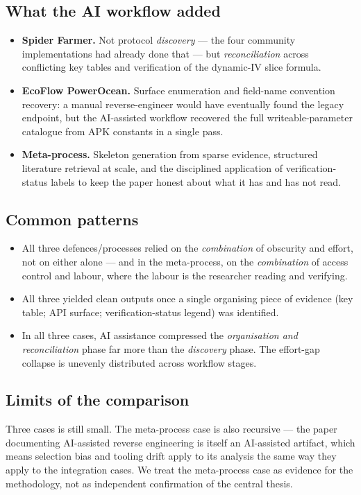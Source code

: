 \documentclass[11pt,a4paper]{article}
\begin{document}
\subsection{What the AI workflow added}
\label{sec:synthesis-ai-lift}
\begin{itemize}
  \item \textbf{Spider Farmer.} Not protocol \emph{discovery} --- the four
        community implementations had already done that --- but
        \emph{reconciliation} across conflicting key tables and verification
        of the dynamic-IV slice formula.
  \item \textbf{EcoFlow PowerOcean.} Surface enumeration and field-name
        convention recovery: a manual reverse-engineer would have eventually
        found the legacy endpoint, but the AI-assisted workflow recovered
        the full writeable-parameter catalogue from APK constants in a
        single pass.
  \item \textbf{Meta-process.} Skeleton generation from sparse evidence,
        structured literature retrieval at scale, and the disciplined
        application of verification-status labels to keep the paper honest
        about what it has and has not read.
\end{itemize}

\subsection{Common patterns}
\label{sec:synthesis-patterns}
\begin{itemize}
  \item All three defences/processes relied on the \emph{combination} of
        obscurity and effort, not on either alone --- and in the
        meta-process, on the \emph{combination} of access control and
        labour, where the labour is the researcher reading and verifying.
  \item All three yielded clean outputs once a single organising piece of
        evidence (key table; API surface; verification-status legend) was
        identified.
  \item In all three cases, AI assistance compressed the \emph{organisation
        and reconciliation} phase far more than the \emph{discovery}
        phase. The effort-gap collapse is unevenly distributed across
        workflow stages.
\end{itemize}

\subsection{Limits of the comparison}
\label{sec:synthesis-limits}
Three cases is still small. The meta-process case is also recursive ---
the paper documenting AI-assisted reverse engineering is itself an
AI-assisted artifact, which means selection bias and tooling drift apply
to its analysis the same way they apply to the integration cases. We
treat the meta-process case as evidence for the methodology, not as
independent confirmation of the central thesis.
\end{document}
